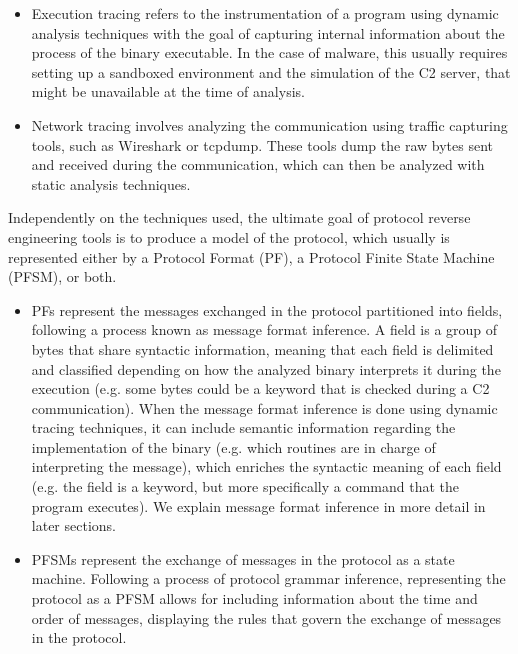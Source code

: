 \documentclass[conference]{IEEEtran}
\begin{document}
\begin{itemize}
    \item Execution tracing refers to the instrumentation of a program using dynamic
          analysis techniques with the goal of capturing internal information about the
          process of the binary executable. In the case of malware, this usually requires
          setting up a sandboxed environment and the simulation of the C2 server, that
          might be unavailable at the time of analysis.
    \item Network tracing involves analyzing the communication using traffic capturing
          tools, such as Wireshark or tcpdump. These tools dump the raw bytes sent and
          received during the communication, which can then be analyzed with static
          analysis techniques.
\end{itemize}

Independently on the techniques used, the ultimate goal of protocol reverse
engineering tools is to produce a model of the protocol, which usually is
represented either by a Protocol Format (PF), a Protocol Finite State Machine
(PFSM), or both.
\begin{itemize}
    \item PFs represent the messages exchanged in the protocol partitioned into fields,
          following a process known as message format inference. A field is a group of
          bytes that share syntactic information, meaning that each field is delimited
          and classified depending on how the analyzed binary interprets it during the
          execution \cite{polyglot_caballero} (e.g. some bytes could be a keyword that is
          checked during a C2 communication). When the message format inference is done
          using dynamic tracing techniques, it can include semantic information regarding
          the implementation of the binary (e.g. which routines are in charge of
          interpreting the message), which enriches the syntactic meaning of each field
          (e.g. the field is a keyword, but more specifically a command that the program
          executes). We explain message format inference in more detail in later sections.
    \item PFSMs represent the exchange of messages in the protocol as a state machine.
          Following a process of protocol grammar inference, representing the protocol as
          a PFSM allows for including information about the time and order of messages,
          displaying the rules that govern the exchange of messages in the protocol.
\end{itemize}
\end{document}
